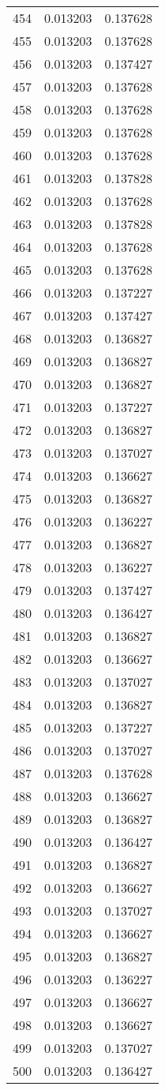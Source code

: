 \begin{longtable}{rrr}
454 & 0.013203 & 0.137628 \\
455 & 0.013203 & 0.137628 \\
456 & 0.013203 & 0.137427 \\
457 & 0.013203 & 0.137628 \\
458 & 0.013203 & 0.137628 \\
459 & 0.013203 & 0.137628 \\
460 & 0.013203 & 0.137628 \\
461 & 0.013203 & 0.137828 \\
462 & 0.013203 & 0.137628 \\
463 & 0.013203 & 0.137828 \\
464 & 0.013203 & 0.137628 \\
465 & 0.013203 & 0.137628 \\
466 & 0.013203 & 0.137227 \\
467 & 0.013203 & 0.137427 \\
468 & 0.013203 & 0.136827 \\
469 & 0.013203 & 0.136827 \\
470 & 0.013203 & 0.136827 \\
471 & 0.013203 & 0.137227 \\
472 & 0.013203 & 0.136827 \\
473 & 0.013203 & 0.137027 \\
474 & 0.013203 & 0.136627 \\
475 & 0.013203 & 0.136827 \\
476 & 0.013203 & 0.136227 \\
477 & 0.013203 & 0.136827 \\
478 & 0.013203 & 0.136227 \\
479 & 0.013203 & 0.137427 \\
480 & 0.013203 & 0.136427 \\
481 & 0.013203 & 0.136827 \\
482 & 0.013203 & 0.136627 \\
483 & 0.013203 & 0.137027 \\
484 & 0.013203 & 0.136827 \\
485 & 0.013203 & 0.137227 \\
486 & 0.013203 & 0.137027 \\
487 & 0.013203 & 0.137628 \\
488 & 0.013203 & 0.136627 \\
489 & 0.013203 & 0.136827 \\
490 & 0.013203 & 0.136427 \\
491 & 0.013203 & 0.136827 \\
492 & 0.013203 & 0.136627 \\
493 & 0.013203 & 0.137027 \\
494 & 0.013203 & 0.136627 \\
495 & 0.013203 & 0.136827 \\
496 & 0.013203 & 0.136227 \\
497 & 0.013203 & 0.136627 \\
498 & 0.013203 & 0.136627 \\
499 & 0.013203 & 0.137027 \\
500 & 0.013203 & 0.136427 \\
\end{longtable}
